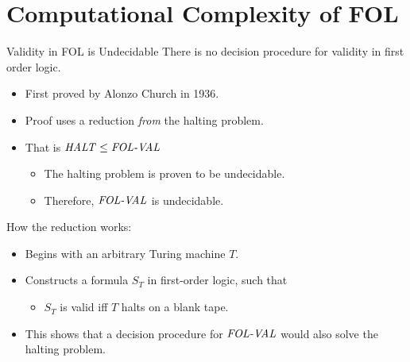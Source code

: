 \documentclass[style=sailor,size=12pt]{powerdot}
\begin{document}
\section[]{Computational Complexity of FOL}
\begin{slide}[bm=,toc=]{Validity in FOL is Undecidable}
There is no decision procedure for validity in first order logic.
\begin{itemize}
\item<2-> First proved by Alonzo Church in 1936.
\item<3-> Proof uses a reduction \emph{from} the halting problem.
\item<4-> That is $\mbox{\it HALT\/} \leq \mbox{\it FOL-VAL\/}$
\begin{itemize}
\item<5-> The halting problem is proven to be undecidable.
\item<6-> Therefore, $\mbox{\it FOL-VAL\/}$ is undecidable.
\end{itemize}
\end{itemize}
\pause[6]
How the reduction works:
\begin{itemize}
\item<8-> Begins with an arbitrary Turing machine $T$.
\item<9-> Constructs a formula $S_T$ in first-order logic, such that
\begin{itemize}
\item<10-> $S_T$ is valid iff $T$ halts on a blank tape.
\end{itemize}
\item<11->This shows that a decision procedure for $\mbox{\it FOL-VAL\/}$ would also solve
the halting problem.
\end{itemize}
\end{slide}
\end{document}
